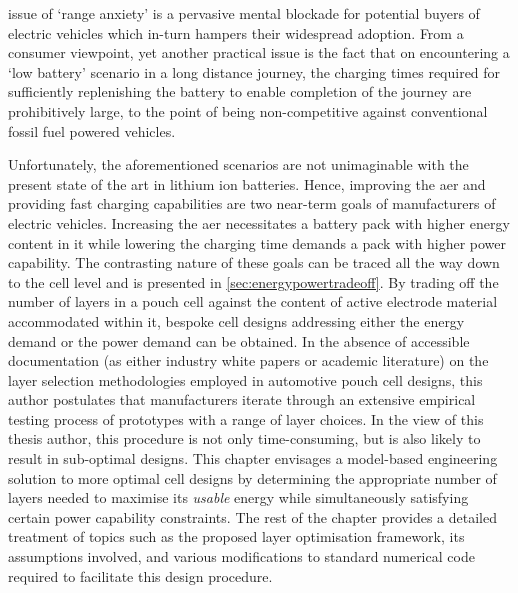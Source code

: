 

 issue of `range anxiety'  is a pervasive mental blockade for
potential buyers  of electric  vehicles which  in-turn hampers  their widespread
adoption. From  a consumer viewpoint,  yet another  practical issue is  the fact
that on  encountering a `low battery'  scenario in a long  distance journey, the
charging  times required  for sufficiently  replenishing the  battery to  enable
completion  of the  journey  are  prohibitively large,  to  the  point of  being
non-competitive against conventional fossil fuel powered vehicles.

Unfortunately,  the  aforementioned  scenarios  are not  unimaginable  with  the
present  state  of the  art  in  lithium  ion  batteries. Hence,  improving  the
\gls{aer} and  providing fast charging  capabilities are two near-term  goals of
manufacturers  of electric  vehicles.  Increasing the  \gls{aer} necessitates  a
battery pack with  higher energy content in it while  lowering the charging time
demands a  pack with higher  power capability.  The contrasting nature  of these
goals can  be traced  all the way  down to  the cell level  and is  presented in
\cref{sec:energypowertradeoff}. By trading  off the number of layers  in a pouch
cell  against  the content  of  active  electrode material  accommodated  within
it,  bespoke cell  designs  addressing either  the energy  demand  or the  power
demand  can  be  obtained.  In  the  absence  of  accessible  documentation  (as
either  industry white  papers or  academic literature)  on the  layer selection
methodologies employed in automotive pouch  cell designs, this author postulates
that manufacturers  iterate through  an extensive  empirical testing  process of
prototypes with  a range of  layer choices. In the  view of this  thesis author,
this  procedure is  not only  time-consuming, but  is also  likely to  result in
sub-optimal designs.  This chapter envisages a  model-based engineering solution
to more  optimal cell designs  by determining  the appropriate number  of layers
needed  to maximise  its  \emph{usable} energy  while simultaneously  satisfying
certain  power  capability constraints.  The  rest  of  the chapter  provides  a
detailed treatment of topics such  as the proposed layer optimisation framework,
its assumptions involved,  and various modifications to  standard numerical code
required to facilitate this design procedure.

